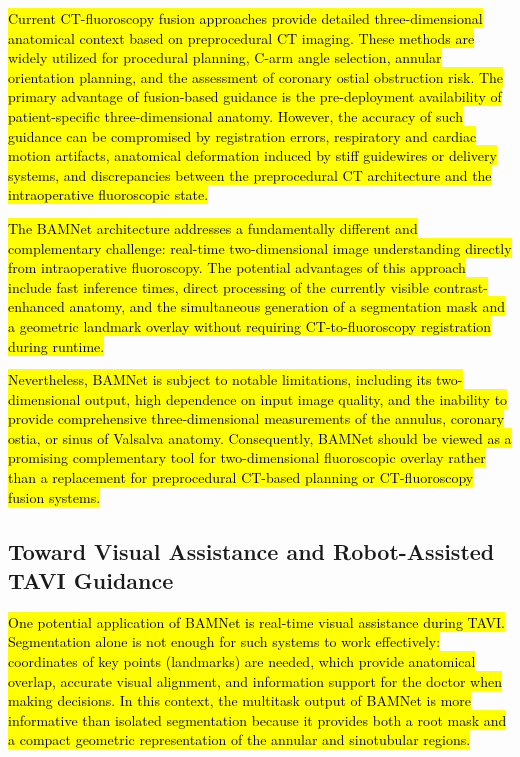 \documentclass[utf8]{FrontiersinHarvard}
\begin{document}
\hl{Current CT-fluoroscopy fusion approaches provide detailed three-dimensional anatomical context based on preprocedural CT imaging. 
These methods are widely utilized for procedural planning, C-arm angle selection, annular orientation planning, and the assessment 
of coronary ostial obstruction risk. The primary advantage of fusion-based guidance is the pre-deployment availability of patient-specific 
three-dimensional anatomy. However, the accuracy of such guidance can be compromised by registration errors, respiratory and cardiac motion 
artifacts, anatomical deformation induced by stiff guidewires or delivery systems, and discrepancies between the preprocedural CT architecture 
and the intraoperative fluoroscopic state.}

\hl{The BAMNet architecture addresses a fundamentally different and complementary challenge: real-time two-dimensional image understanding 
directly from intraoperative fluoroscopy. The potential advantages of this approach include fast inference times, direct processing of 
the currently visible contrast-enhanced anatomy, and the simultaneous generation of a segmentation mask and a geometric landmark overlay 
without requiring CT-to-fluoroscopy registration during runtime.}

\hl{Nevertheless, BAMNet is subject to notable limitations, including its two-dimensional output, high dependence on input image quality, and 
the inability to provide comprehensive three-dimensional measurements of the annulus, coronary ostia, or sinus of Valsalva anatomy. 
Consequently, BAMNet should be viewed as a promising complementary tool for two-dimensional fluoroscopic overlay rather than a replacement 
for preprocedural CT-based planning or CT-fluoroscopy fusion systems.}

\subsection{Toward Visual Assistance and Robot-Assisted TAVI Guidance}

\hl{One potential application of BAMNet is real-time visual assistance during TAVI. Segmentation alone is not enough for such systems to work effectively: 
coordinates of key points (landmarks) are needed, which provide anatomical overlap, accurate visual alignment, and information support for the doctor 
when making decisions. In this context, the multitask output of BAMNet is more informative than isolated segmentation because it provides both a 
root mask and a compact geometric representation of the annular and sinotubular regions.}
\end{document}
